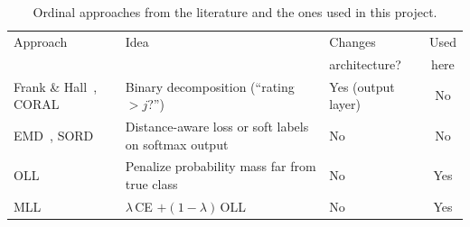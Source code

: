 \begin{table}[t]
\caption{Ordinal approaches from the literature and the ones used in this project.}
\label{tab:related}
\centering
\small
\begin{tabular}{p{1.9cm}p{2.5cm}p{1.4cm}c}
\toprule
Approach & Idea & Changes & Used \\
 & & architecture? & here \\
\midrule
Frank \& Hall~\cite{frank2001}, CORAL~\cite{cao2020} & Binary decomposition (``rating $>j$?'') & Yes (output layer) & No \\
EMD~\cite{hou2017}, SORD~\cite{diaz2019} & Distance-aware loss or soft labels on softmax output & No & No \\
OLL~\cite{castagnos2022} & Penalize probability mass far from true class & No & Yes \\
MLL~\cite{kasa2024} & $\lambda\,$CE $+ (1-\lambda)\,$OLL & No & Yes \\
\bottomrule
\end{tabular}
\end{table}
